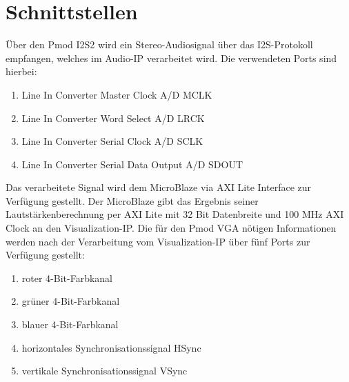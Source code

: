 \section{Schnittstellen}

Über den Pmod I2S2 wird ein Stereo-Audiosignal über das I2S-Protokoll empfangen, welches im Audio-IP verarbeitet wird.
Die verwendeten Ports sind hierbei:
\begin{enumerate}
    \item Line In Converter Master Clock \glqq A/D MCLK\grqq
    \item Line In Converter Word Select \glqq A/D LRCK\grqq
    \item Line In Converter Serial Clock \glqq A/D SCLK\grqq
    \item Line In Converter Serial Data Output \glqq A/D SDOUT\grqq
\end{enumerate}
Das verarbeitete Signal wird dem MicroBlaze via AXI Lite Interface zur Verfügung gestellt.
Der MicroBlaze gibt das Ergebnis seiner Lautstärkenberechnung per AXI Lite mit 32 Bit Datenbreite und 100 MHz AXI Clock an den Visualization-IP.
Die für den Pmod VGA nötigen Informationen werden nach der Verarbeitung vom Visualization-IP über fünf Ports zur Verfügung gestellt:
\begin{enumerate}
    \item roter 4-Bit-Farbkanal
    \item grüner 4-Bit-Farbkanal
    \item blauer 4-Bit-Farbkanal
    \item horizontales Synchronisationssignal \glqq HSync\grqq
    \item vertikale Synchronisationssignal \glqq VSync\grqq
\end{enumerate}